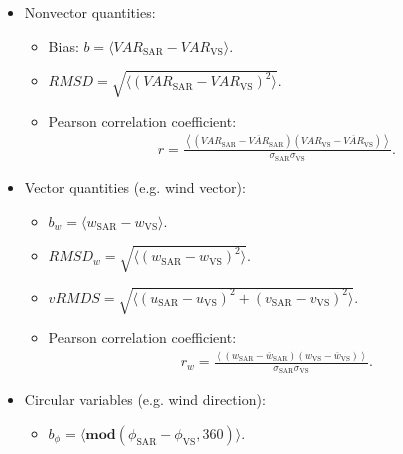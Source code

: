 \documentclass[a4paper,10pt,english]{sphinxmanual}
\begin{document}
\sphinxAtStartPar
{}
\begin{itemize}
\item {} 
\sphinxAtStartPar
Non\sphinxhyphen{}vector quantities:
\begin{itemize}
\item {} 
\sphinxAtStartPar
Bias: \(b=\langle VAR_{\mathrm{SAR}}-VAR_{\mathrm{VS}}\rangle\).

\item {} 
\sphinxAtStartPar
\(RMSD=\sqrt{\langle(VAR_{\mathrm{SAR}}-VAR_{\mathrm{VS}})^2\rangle}\).

\item {} 
\sphinxAtStartPar
Pearson correlation coefficient:
\begin{equation*}
\begin{split}r=
\frac{\left\langle
(VAR_{\mathrm{SAR}}-\overline{VAR}_{\mathrm{SAR}})
(VAR_{\mathrm{VS}}-\overline{VAR}_{\mathrm{VS}})
\right\rangle}
{\sigma_{\mathrm{SAR}}\sigma_{\mathrm{VS}}} .\end{split}
\end{equation*}
\end{itemize}

\item {} 
\sphinxAtStartPar
Vector quantities (e.g. wind vector):
\begin{itemize}
\item {} 
\sphinxAtStartPar
\(b_w=\langle w_{\mathrm{SAR}}-w_{\mathrm{VS}}\rangle\).

\item {} 
\sphinxAtStartPar
\(RMSD_w=\sqrt{\langle(w_{\mathrm{SAR}}-w_{\mathrm{VS}})^2\rangle}\).

\item {} 
\sphinxAtStartPar
\(vRMDS=\sqrt{\langle
(u_{\mathrm{SAR}}-u_{\mathrm{VS}})^2+
(v_{\mathrm{SAR}}-v_{\mathrm{VS}})^2\rangle}\).

\item {} 
\sphinxAtStartPar
Pearson correlation coefficient:
\begin{equation*}
\begin{split}r_w=
\frac{\left\langle
(w_{\mathrm{SAR}}-\overline{w}_{\mathrm{SAR}})
(w_{\mathrm{VS}}-\overline{w}_{\mathrm{VS}})
\right\rangle}
{\sigma_{\mathrm{SAR}}\sigma_{\mathrm{VS}}} .\end{split}
\end{equation*}
\end{itemize}

\item {} 
\sphinxAtStartPar
Circular variables (e.g. wind direction):
\begin{itemize}
\item {} 
\sphinxAtStartPar
\(b_\phi=\langle\mathbf{mod}(\phi_{\mathrm{SAR}}-\phi_{\mathrm{VS}},360)\rangle\).


\end{itemize}
\end{itemize}
\end{document}
